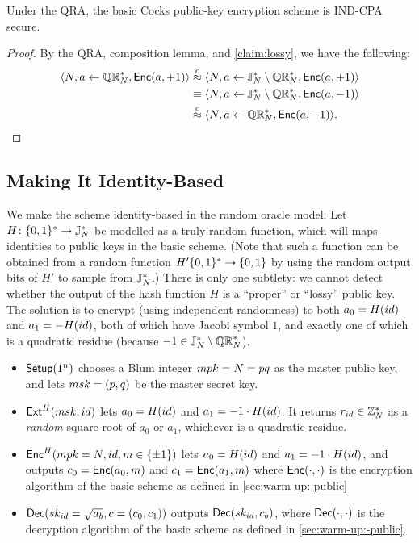 \documentclass[11pt]{article}
\begin{document}
\begin{corollary}
  \label{cor:ind-cpa-cocks-basic}
  Under the QRA, the basic Cocks public-key encryption scheme is
  IND-CPA secure.
\end{corollary}

\begin{proof}
  By the QRA, composition lemma, and \cref{claim:lossy}, we have
  the following:
  \begin{align*}
    \langle N, a \gets \mathbb{QR}_{N}^{*}, \mathsf{Enc}(a, +1) \rangle & \stackrel{c}{\approx}
    \langle N, a \gets \mathbb{J}_N^{*} \setminus \mathbb{QR}_{N}^{*}, \mathsf{Enc}(a, +1)
    \rangle \\
    &\equiv \langle N, a \gets \mathbb{J}_N^{*} \setminus \mathbb{QR}_{N}^{*},
    \mathsf{Enc}(a, -1) \rangle \\
    &\stackrel{c}{\approx} \langle N, a \gets \mathbb{QR}_{N}^{*}, \mathsf{Enc}(a, -1) \rangle.
  \end{align*}
\end{proof}

\subsection{Making It Identity-Based}
\label{sec:making-id-based}


We make the scheme identity-based in the random oracle model.  Let $H
\colon \{0,1\}^{*} \to \mathbb{J}_N^{*}$ be modelled as a truly random function,
which will maps identities to public keys in the basic scheme.  (Note
that such a function can be obtained from a random function $H'
\{0,1\}^{*} \to \{0,1\}$ by using the random output bits of $H'$ to sample
from $\mathbb{J}_N^{*}$.)  There is only one subtlety: we cannot detect whether
the output of the hash function $H$ is a ``proper'' or ``lossy''
public key.  The solution is to encrypt (using independent randomness)
to both $a_{0} = H(id)$ and $a_{1} = -H(id)$, both of which have
Jacobi symbol $1$, and exactly one of which is a quadratic residue
(because $-1 \in \mathbb{J}_N^{*} \setminus \mathbb{QR}_{N}^{*}$).

\begin{itemize}
\item $\mathsf{Setup}(1^{n})$ chooses a Blum integer $mpk = N = pq$ as the
  master public key, and lets $msk = (p,q)$ be the master secret key.
\item $\mathsf{Ext}^{H}(msk, id)$ lets $a_0 = H(id)$ and $a_1 = -1 \cdot
  H(id)$.  It returns $r_{id} \in \mathbb{Z}_N^{*}$ as a \emph{random} square
  root of $a_0$ or $a_1$, whichever is a quadratic residue.
\item $\mathsf{Enc}^{H}(mpk = N, id, m \in \{\pm 1\})$ lets $a_0 =
  H(id)$ and $a_1 = -1 \cdot H(id)$, and outputs $c_0 =
  \mathsf{Enc}(a_0,m)$ and $c_1 = \mathsf{Enc}(a_1,m)$ where $\mathsf{Enc}(\cdot,
  \cdot)$ is the encryption algorithm of the basic scheme as defined
  in \cref{sec:warm-up:-public}
\item $\mathsf{Dec}(sk_{id} = \sqrt{a_b}, c = (c_0,c_1))$ outputs
  $\mathsf{Dec}(sk_{id}, c_b)$, where $\mathsf{Dec}(\cdot,\cdot)$ is the
  decryption algorithm of the basic scheme as defined in
  \cref{sec:warm-up:-public}.
\end{itemize}
\end{document}
